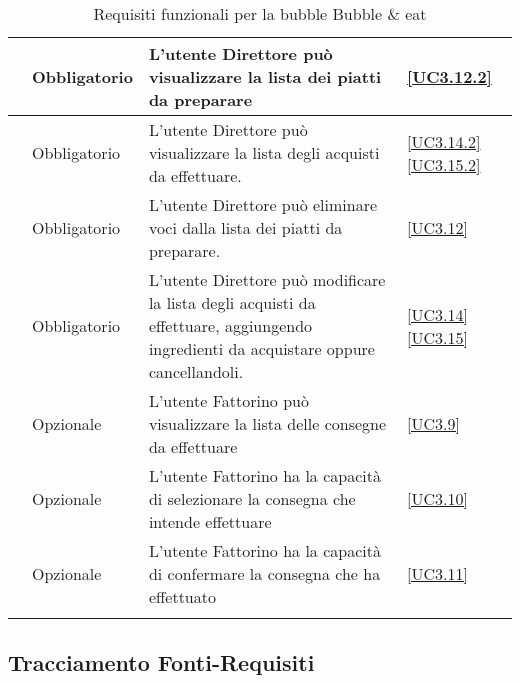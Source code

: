 \begin{longtable}{|P{1.5cm}|P{2.5cm}|P{6.5cm}|P{2.5cm}|}
	\hline \RequisitoObF\label{L30} & Obbligatorio & L'utente Direttore può visualizzare la lista dei piatti da preparare & \ref{UC3.12.2} \\
	\hline \RequisitoObF\label{L31} & Obbligatorio & L'utente Direttore può visualizzare la lista degli acquisti da effettuare. & \ref{UC3.14.2} \ref{UC3.15.2} \\
	\hline \RequisitoObF\label{L32} & Obbligatorio & L'utente Direttore può eliminare voci dalla lista dei piatti da preparare. & \ref{UC3.12} \\
	\hline \RequisitoObF\label{L53} & Obbligatorio & L'utente Direttore può modificare la lista degli acquisti da effettuare, aggiungendo ingredienti da acquistare oppure cancellandoli.
	 & \ref{UC3.14} \linebreak \ref{UC3.15} \\	 
	\hline \RequisitoOpF\label{L50} & Opzionale & L'utente Fattorino può visualizzare la lista delle consegne da effettuare & \ref{UC3.9} \\
	\hline \RequisitoOpF\label{L51} & Opzionale & L'utente Fattorino ha la capacità di selezionare la consegna che intende effettuare & \ref{UC3.10} \\
	\hline \RequisitoOpF\label{L52} & Opzionale & L'utente Fattorino ha la capacità di confermare la consegna che ha effettuato & \ref{UC3.11} \\
	\hline
	\caption{Requisiti funzionali per la bubble Bubble \& eat}
\end{longtable}

\subsection{Tracciamento Fonti-Requisiti}

